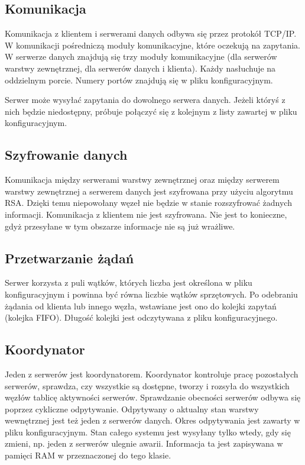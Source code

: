 \subsection{Komunikacja}
Komunikacja z klientem i serwerami danych odbywa się przez protokół TCP/IP. W komunikacji pośredniczą moduły komunikacyjne, które oczekują na zapytania. W serwerze danych znajdują się trzy moduły komunikacyjne (dla serwerów warstwy zewnętrznej, dla serwerów danych i klienta). Każdy nasłuchuje na oddzielnym porcie. Numery portów znajdują się w pliku konfiguracyjnym. 

Serwer może wysyłać zapytania do dowolnego serwera danych. Jeżeli któryś z nich będzie niedostępny, próbuje połączyć się z kolejnym z listy zawartej w pliku konfiguracyjnym.

\subsection{Szyfrowanie danych}
Komunikacja między serwerami warstwy zewnętrznej oraz między serwerem warstwy zewnętrznej a serwerem danych jest szyfrowana przy użyciu algorytmu RSA. Dzięki temu niepowołany węzeł nie będzie w stanie rozszyfrować żadnych informacji. Komunikacja z klientem nie jest szyfrowana. Nie jest to konieczne, gdyż przesyłane w tym obszarze informacje nie są już wrażliwe.

\subsection{Przetwarzanie żądań}
Serwer korzysta z puli wątków, których liczba jest określona w pliku konfiguracyjnym i powinna być równa liczbie wątków sprzętowych. Po odebraniu żądania od klienta lub innego węzła, wstawiane jest ono do kolejki zapytań (kolejka FIFO). Długość kolejki jest odczytywana z pliku konfiguracyjnego.

\subsection{Koordynator}
Jeden z serwerów jest koordynatorem. Koordynator kontroluje pracę pozostałych serwerów, sprawdza, czy wszystkie są dostępne, tworzy i rozsyła do wszystkich węzłów tablicę aktywności serwerów. Sprawdzanie obecności serwerów odbywa się poprzez cykliczne odpytywanie. Odpytywany o aktualny stan warstwy wewnętrznej jest też jeden z serwerów danych. Okres odpytywania jest zawarty w pliku konfiguracyjnym. Stan całego systemu jest wysyłany tylko wtedy, gdy się zmieni, np. jeden z serwerów ulegnie awarii. Informacja ta jest zapisywana w pamięci RAM w przeznaczonej do tego klasie.

